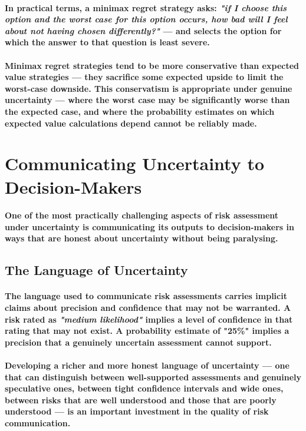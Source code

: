 \paragraph{In practical terms, a minimax regret strategy asks: \textit{"if I choose this option and the worst case for this option occurs, how bad will I feel about not having chosen differently?"} — and selects the option for which the answer to that question is least severe.}
\paragraph{Minimax regret strategies tend to be more conservative than expected value strategies — they sacrifice some expected upside to limit the worst-case downside. This conservatism is appropriate under genuine uncertainty — where the worst case may be significantly worse than the expected case, and where the probability estimates on which expected value calculations depend cannot be reliably made.}

\section{Communicating Uncertainty to Decision-Makers}
\paragraph{One of the most practically challenging aspects of risk assessment under uncertainty is communicating its outputs to decision-makers in ways that are honest about uncertainty without being paralysing.}

\subsection{The Language of Uncertainty}
\paragraph{The language used to communicate risk assessments carries implicit claims about precision and confidence that may not be warranted. A risk rated as \textit{"medium likelihood"} implies a level of confidence in that rating that may not exist. A probability estimate of "25\%" implies a precision that a genuinely uncertain assessment cannot support.}
\paragraph{Developing a richer and more honest language of uncertainty — one that can distinguish between well-supported assessments and genuinely speculative ones, between tight confidence intervals and wide ones, between risks that are well understood and those that are poorly understood — is an important investment in the quality of risk communication.}
